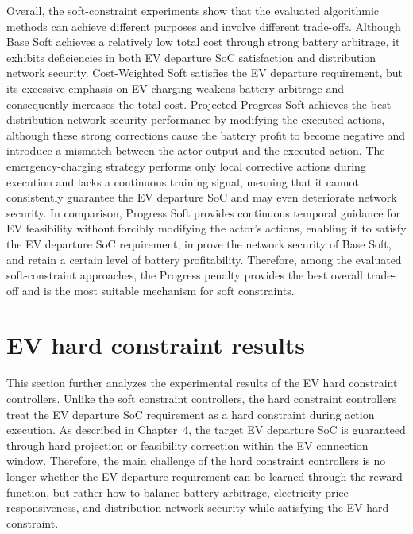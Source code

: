 Overall, the soft-constraint experiments show that the evaluated algorithmic methods can achieve different purposes and involve different trade-offs. Although Base Soft achieves a relatively low total cost through strong battery arbitrage, it exhibits deficiencies in both EV departure SoC satisfaction and distribution network security. Cost-Weighted Soft satisfies the EV departure requirement, but its excessive emphasis on EV charging weakens battery arbitrage and consequently increases the total cost. Projected Progress Soft achieves the best distribution network security performance by modifying the executed actions, although these strong corrections cause the battery profit to become negative and introduce a mismatch between the actor output and the executed action. The emergency-charging strategy performs only local corrective actions during execution and lacks a continuous training signal, meaning that it cannot consistently guarantee the EV departure SoC and may even deteriorate network security. In comparison, Progress Soft provides continuous temporal guidance for EV feasibility without forcibly modifying the actor's actions, enabling it to satisfy the EV departure SoC requirement, improve the network security of Base Soft, and retain a certain level of battery profitability. Therefore, among the evaluated soft-constraint approaches, the Progress penalty provides the best overall trade-off and is the most suitable mechanism for soft constraints. 

\section{EV hard constraint results}\label{section:madrl-hard-results}

This section further analyzes the experimental results of the EV hard constraint controllers. Unlike the soft constraint controllers, the hard constraint controllers treat the EV departure SoC requirement as a hard constraint during action execution. As described in Chapter~4, the target EV departure SoC is guaranteed through hard projection or feasibility correction within the EV connection window. Therefore, the main challenge of the hard constraint controllers is no longer whether the EV departure requirement can be learned through the reward function, but rather how to balance battery arbitrage, electricity price responsiveness, and distribution network security while satisfying the EV hard constraint.

